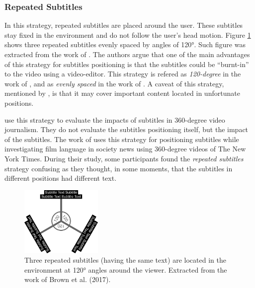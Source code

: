 \subsubsection{Repeated Subtitles}
\label{subsubsection:repeated_subtitles}

In this strategy, repeated subtitles are placed around the user. These subtitles stay fixed in the environment and do not follow the user's head motion. Figure \ref{fig:120_subtitles} shows three repeated subtitles evenly spaced by angles of 120°. Such figure was extracted from the work of . The authors argue that one of the main advantages of this strategy for subtitles positioning is that the subtitles could be ``burnt-in'' to the video using a video-editor. This strategy is refered as \emph{120-degree} in the work of , and as \emph{evenly spaced} in the work of . A caveat of this strategy, mentioned by , is that it may cover important content located in unfortunate positions. 

 use this strategy to evaluate the impacts of subtitles in 360-degree video journalism. They do not evaluate the subtitles positioning itself, but the impact of the subtitles. The work of  uses this strategy for positioning subtitles while investigating film language in society news using 360-degree videos of The New York Times. During their study, some participants found the \emph{repeated subtitles} strategy confusing as they thought, in some moments, that the subtitles in different positions had different text.

\begin{figure}[!ht]
    \centering
    \includegraphics[width=0.35\textwidth]{img/120_subtitles.png}
    \caption{Three repeated subtitles (having the same text) are located in the environment at 120° angles around the viewer. Extracted from the work of Brown et al. (2017).}
    \label{fig:120_subtitles}
\end{figure}

